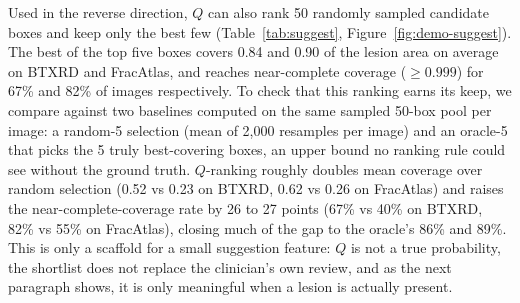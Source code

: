 \begin{table}[t]
\caption{Spearman correlation between each training-free cue and the true per-prompt Dice, plus $Q$'s Pearson correlation for comparison. $Q = \mathrm{mean}(S_\mathrm{sharp}, S_\mathrm{stab})$.}
\label{tab:selfassess}
\centering
\scriptsize
{}
\end{table}

Used in the reverse direction, $Q$ can also rank 50 randomly sampled candidate boxes and keep only the best few (Table~\ref{tab:suggest}, Figure~\ref{fig:demo-suggest}). The best of the top five boxes covers 0.84 and 0.90 of the lesion area on average on BTXRD and FracAtlas, and reaches near-complete coverage ($\ge0.999$) for 67\% and 82\% of images respectively. To check that this ranking earns its keep, we compare against two baselines computed on the same sampled 50-box pool per image: a random-5 selection (mean of 2,000 resamples per image) and an oracle-5 that picks the 5 truly best-covering boxes, an upper bound no ranking rule could see without the ground truth. $Q$-ranking roughly doubles mean coverage over random selection (0.52 vs 0.23 on BTXRD, 0.62 vs 0.26 on FracAtlas) and raises the near-complete-coverage rate by 26 to 27 points (67\% vs 40\% on BTXRD, 82\% vs 55\% on FracAtlas), closing much of the gap to the oracle's 86\% and 89\%. This is only a scaffold for a small suggestion feature: $Q$ is not a true probability, the shortlist does not replace the clinician's own review, and as the next paragraph shows, it is only meaningful when a lesion is actually present.

